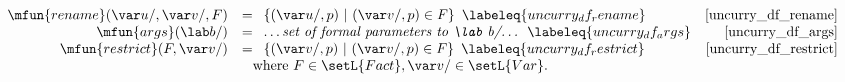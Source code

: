 \begin{math}
\begin{array}{rlr}
    \mfun{rename}(\var u/, \var v/, F) &= \begin{array}{l}
      \{(\var u/, p)\ |\ (\var v/, p) \in F\}
    \end{array} \labeleq{uncurry_df_rename} & \eqref{uncurry_df_rename} \\

    \mfun{args}(\lab b/) &= \begin{array}{l}
      \text{\dots\it set of formal parameters to \lab b/\dots}
    \end{array} \labeleq{uncurry_df_args} & \eqref{uncurry_df_args} \\

    \mfun{restrict}(F, \var v/) &= \begin{array}{l}
      \{(\var v/, p)\ |\ (\var v/, p) \in F\} 
    \end{array} \labeleq{uncurry_df_restrict} & \eqref{uncurry_df_restrict} \\

    & \multicolumn{2}{l}{\phantom{=} \text{where\ } F \in \setL{Fact}, \var v/ \in \setL{Var}.}
  \end{array}
\end{math}
